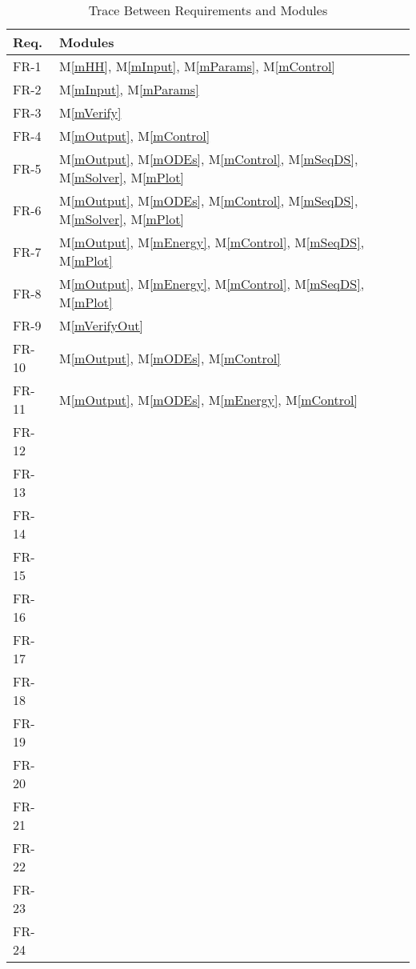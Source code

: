 \documentclass[12pt, titlepage]{article}
\newcommand{\mref}[1]{M\ref{#1}}
\begin{document}
\begin{table}[H]
\centering
\begin{tabular}{p{} p{}}
\toprule
\textbf{Req.} & \textbf{Modules}\\
\midrule
FR-1 & \mref{mHH}, \mref{mInput}, \mref{mParams}, \mref{mControl}\\
FR-2 & \mref{mInput}, \mref{mParams}\\
FR-3 & \mref{mVerify}\\
FR-4 & \mref{mOutput}, \mref{mControl}\\
FR-5 & \mref{mOutput}, \mref{mODEs}, \mref{mControl}, \mref{mSeqDS}, \mref{mSolver}, \mref{mPlot}\\
FR-6 & \mref{mOutput}, \mref{mODEs}, \mref{mControl}, \mref{mSeqDS}, \mref{mSolver}, \mref{mPlot}\\
FR-7 & \mref{mOutput}, \mref{mEnergy}, \mref{mControl}, \mref{mSeqDS}, \mref{mPlot}\\
FR-8 & \mref{mOutput}, \mref{mEnergy}, \mref{mControl}, \mref{mSeqDS}, \mref{mPlot}\\
FR-9 & \mref{mVerifyOut}\\
FR-10 & \mref{mOutput}, \mref{mODEs}, \mref{mControl}\\
FR-11 & \mref{mOutput}, \mref{mODEs}, \mref{mEnergy}, \mref{mControl}\\
FR-12 & \\
FR-13 & \\
FR-14 & \\
FR-15 & \\
FR-16 & \\
FR-17 & \\
FR-18 & \\
FR-19 & \\
FR-20 & \\
FR-21 & \\
FR-22 & \\
FR-23 & \\
FR-24 & \\
\bottomrule
\end{tabular}
\caption{Trace Between Requirements and Modules}
\label{TblRT}
\end{table}
\end{document}
